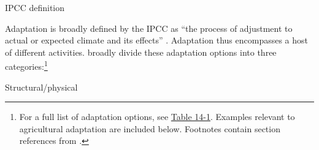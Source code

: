 \documentclass[10 pt]{article}
\begin{document}
\begin{outline}


\item IPCC definition

Adaptation is broadly defined by the IPCC as ``the process of adjustment to actual or expected climate and its effects'' \parencite{IPCC5WG2}.  %
Adaptation thus encompasses a host of different activities.
\textcite{IPCC5WG2C14} broadly divide these adaptation options into three categories:\footnote{
		For a full list of adaptation options, see \href{https://www.ipcc.ch/site/assets/uploads/2018/02/WGII_AR5_Table14-1.jpg}{Table 14-1}.
		Examples relevant to agricultural adaptation are included below. 
		Footnotes contain section references from \textcite{IPCC5WG2}.
	} 
	\begin{blist}
		\item Structural/physical \nts{[
			adapting transport systems;\footnote{
				See 8.3.3.6., 8.3.3.2.; Table 8-6; 10.4.4.
			} %
			adjusting crop and livestock varieties and practices;\footnote{
				Adjusting crop practices includes cultivar adjustments, planting date adjustments, fertilizer optimization, irrigation optimization (7.5.1.1.1., Table 7-2, Table 9-7, and 7.5.1.1.3.), 
				hydroponics
			}
}
\end{blist}
\end{outline}
\end{document}
